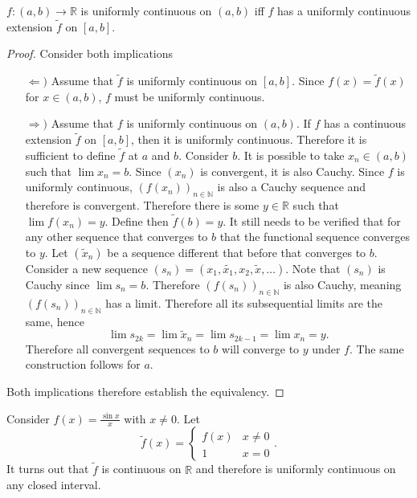 \documentclass[../notes.tex]{subfiles}
\begin{document}
\begin{theorem}
    $f: (a,b) \to \mathbb{R}$ is uniformly continuous on $(a,b)$ iff $f$ has a uniformly continuous extension $\tilde{f}$ on $[a,b]$.
\end{theorem}
\begin{proof}
    Consider both implications
    \begin{enumerate}
        \item[$\Leftarrow)$]
            Assume that $\tilde{f}$ is uniformly continuous on $[a,b]$. Since $f(x) = \tilde{f}(x)$ for $x \in (a,b)$, $f$ must be uniformly continuous.
        \item[$\Rightarrow)$]
            Assume that $f$ is uniformly continuous on $(a,b)$. If $f$ has a continuous extension $\tilde{f}$ on $[a,b]$, then it is uniformly continuous. Therefore it is sufficient to define $\tilde{f}$ at $a$ and $b$. Consider $b$. It is possible to take $x_n \in (a,b)$ such that $\lim x_n = b$. Since $(x_n)$ is convergent, it is also Cauchy. Since $f$ is uniformly continuous, $(f(x_n))_{n \in \mathbb{N}}$ is also a Cauchy sequence and therefore is convergent. Therefore there is some $y \in \mathbb{R}$ such that $\lim f(x_n) = y$. Define then $\tilde{f}(b) = y$. It still needs to be verified that for any other sequence that converges to $b$ that the functional sequence converges to $y$. Let $(\tilde{x}_n)$ be a sequence different that before that converges to $b$. Consider a new sequence $(s_n) = (x_1, \tilde{x_1}, x_2, \tilde{x}, \ldots)$. Note that $(s_n)$ is Cauchy since $\lim s_n = b$. Therefore $(f(s_n))_{n\in \mathbb{N}}$ is also Cauchy, meaning $(f(s_n))_{n\in \mathbb{N}}$ has a limit. Therefore all its subsequential limits are the same, hence
            \[
                \lim s_{2k} = \lim \tilde{x}_n = \lim s_{2k - 1} = \lim x_n = y
            .\]
            Therefore all convergent sequences to $b$ will converge to $y$ under $f$. The same construction follows for $a$.
    \end{enumerate}
    Both implications therefore establish the equivalency.
\end{proof}

\begin{example}
    Consider $f(x) = \frac{\sin x}{x}$ with $x\neq 0$. Let
    \[
        \tilde{f}(x) = \begin{cases}
            f(x) & x\neq 0 \\
            1 & x = 0
        \end{cases}
    .\]
    It turns out that $\tilde{f}$ is continuous on $\mathbb{R}$ and therefore is uniformly continuous on any closed interval.
\end{example}
\end{document}
